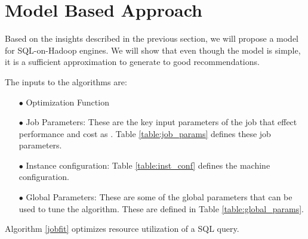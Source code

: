 \section{Model Based Approach}
Based on the insights described in the previous section, we will propose a model for SQL-on-Hadoop engines. We will show that even though the model is simple, it is a sufficient approximation to generate to good recommendations. 

The inputs to the algorithms are:
\begin{enumerate}
    \item[$\bullet$] Optimization Function  
    \item[$\bullet$] Job Parameters: These are the key input parameters of the job that effect performance and cost as . Table \ref{table:job_params} defines these job parameters.
    \item[$\bullet$] Instance configuration: Table \ref{table:inst_conf} defines the machine configuration.
    \item[$\bullet$] Global Parameters: These are some of the global parameters that can be used to tune the algorithm. These are defined in Table \ref{table:global_params}.
\end{enumerate}

Algorithm \ref{jobfit} optimizes resource utilization of a SQL query. 


